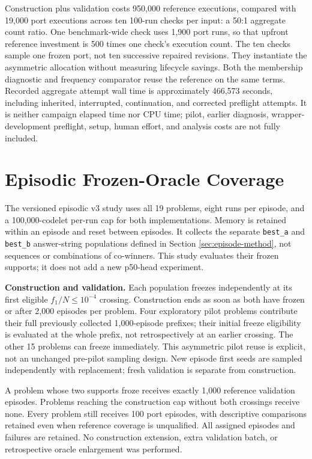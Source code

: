 \documentclass[10pt,letterpaper]{article}
\begin{document}
Construction plus validation costs 950,000 reference executions, compared with 19,000 port
executions across ten 100-run checks per input: a 50:1 aggregate count ratio. One
benchmark-wide check uses 1,900 port runs, so that upfront reference investment is 500
times one check's execution count. The ten checks sample one frozen port, not ten
successive repaired revisions. They instantiate the asymmetric allocation without
measuring lifecycle savings. Both the membership diagnostic and frequency comparator reuse
the reference on the same terms. Recorded aggregate attempt wall time is approximately
466,573 seconds, including inherited, interrupted, continuation, and corrected preflight
attempts. It is neither campaign elapsed time nor CPU time; pilot, earlier diagnosis,
wrapper-development preflight, setup, human effort, and analysis costs are not fully
included.

\section{Episodic Frozen-Oracle Coverage}\label{sec:episodic-coverage}

The versioned episodic v3 study uses all 19 problems, eight runs per episode, and a
100,000-codelet per-run cap for both implementations. Memory is retained within an episode
and reset between episodes. It collects the separate \texttt{best\_a} and \texttt{best\_b}
answer-string populations defined in Section \ref{sec:episode-method}, not sequences or
combinations of co-winners. This study evaluates their frozen supports; it does not add a
new p50-head experiment.

\textbf{Construction and validation.} Each population freezes independently at its first
eligible \(f_1/N\le10^{-4}\) crossing. Construction ends as soon as both have frozen or
after 2,000 episodes per problem. Four exploratory pilot problems contribute their full
previously collected 1,000-episode prefixes; their initial freeze eligibility is evaluated
at the whole prefix, not retrospectively at an earlier crossing. The other 15 problems can
freeze immediately. This asymmetric pilot reuse is explicit, not an unchanged pre-pilot
sampling design. New episode first seeds are sampled independently with replacement; fresh
validation is separate from construction.

A problem whose two supports froze receives exactly 1,000 reference validation episodes.
Problems reaching the construction cap without both crossings receive none. Every problem
still receives 100 port episodes, with descriptive comparisons retained even when
reference coverage is unqualified. All assigned episodes and failures are retained. No
construction extension, extra validation batch, or retrospective oracle enlargement was
performed.
\end{document}
